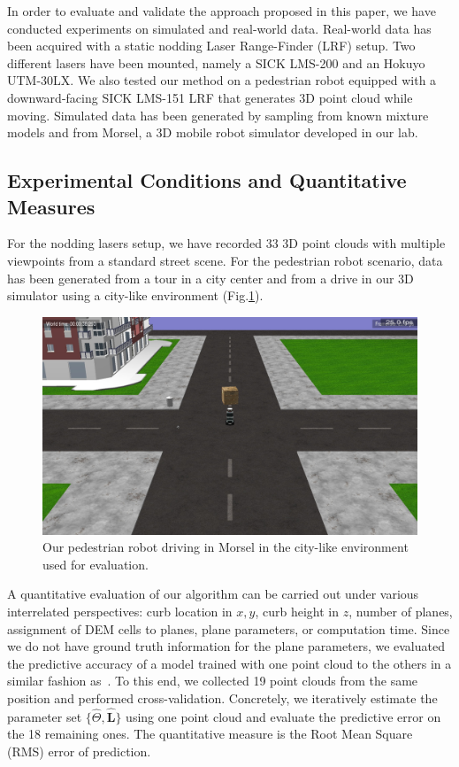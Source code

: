 In order to evaluate and validate the approach proposed in this paper, we have
conducted experiments on simulated and real-world data. Real-world data
has been acquired with a static nodding Laser Range-Finder (LRF) setup. Two
different lasers have been mounted, namely a SICK LMS-200 and an Hokuyo
UTM-30LX. We also tested our method on a pedestrian robot equipped with a
downward-facing SICK LMS-151 LRF that generates 3D point cloud while moving.
Simulated data has been generated by sampling from known mixture models and from
Morsel, a 3D mobile robot simulator developed in our lab.

\subsection{Experimental Conditions and Quantitative Measures}

For the nodding lasers setup, we have recorded 33 3D point clouds with multiple
viewpoints from a standard street scene. For the pedestrian robot scenario, data
has been generated from a tour in a city center and from a drive in our
3D simulator using a city-like environment (Fig.\ref{fig:morsel}).

\begin{figure}[t]
\centering
\includegraphics[width=\columnwidth]{fig/morsel}
\caption{Our pedestrian robot driving in Morsel in the city-like environment
used for evaluation.}
\label{fig:morsel}
\end{figure}

A quantitative evaluation of our algorithm can be carried out under various
interrelated perspectives: curb location in $x,y$, curb height in $z$,
number of planes, assignment of DEM cells to planes, plane parameters, or
computation time. Since we do not have ground truth information for the plane
parameters, we evaluated the predictive accuracy of a model trained
with one point cloud to the others in a similar fashion as~\cite{faria10fitting}.
To this end, we collected 19 point clouds from the same position and performed
cross-validation. Concretely, we iteratively estimate the parameter set
$\{\hat{\Theta},\mathbf{\hat{L}}\}$ using one point cloud and evaluate the
predictive error on the 18 remaining ones. The quantitative measure is the Root
Mean Square (RMS) error of prediction.

